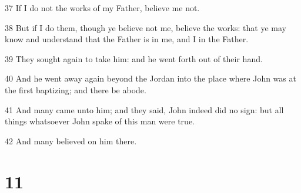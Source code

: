 \par 37 If I do not the works of my Father, believe me not.
\par 38 But if I do them, though ye believe not me, believe the works: that ye may know and understand that the Father is in me, and I in the Father.
\par 39 They sought again to take him: and he went forth out of their hand.
\par 40 And he went away again beyond the Jordan into the place where John was at the first baptizing; and there be abode.
\par 41 And many came unto him; and they said, John indeed did no sign: but all things whatsoever John spake of this man were true.
\par 42 And many believed on him there.

\chapter{11}

